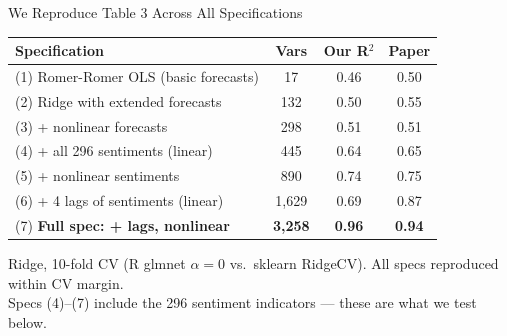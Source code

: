 \documentclass[10pt,aspectratio=169]{beamer}
\begin{document}
\begin{frame}{We Reproduce Table 3 Across All Specifications}
  \vspace{-2pt}
  \begin{center}
    \footnotesize
    \begin{tabular}{lccc}
      \toprule
      \textbf{Specification} & \textbf{Vars} & \textbf{Our R$^2$} & \textbf{Paper} \\
      \midrule
      (1) Romer-Romer OLS (basic forecasts)          & 17    & 0.46 & 0.50 \\
      (2) Ridge with extended forecasts              & 132   & 0.50 & 0.55 \\
      (3) + nonlinear forecasts                      & 298   & 0.51 & 0.51 \\
      (4) + all 296 sentiments (linear)              & 445   & 0.64 & 0.65 \\
      (5) + nonlinear sentiments                     & 890   & 0.74 & 0.75 \\
      (6) + 4 lags of sentiments (linear)            & 1,629 & 0.69 & 0.87 \\
      (7) \textbf{Full spec: + lags, nonlinear}      & \textbf{3,258} & \textbf{0.96} & \textbf{0.94} \\
      \bottomrule
    \end{tabular}
  \end{center}
  \vspace{4pt}
  \begin{block}{}
    \centering\small
    Ridge, 10-fold CV (R glmnet $\alpha=0$ vs.\ sklearn RidgeCV). All specs reproduced within CV margin.\\[2pt]
    Specs (4)--(7) include the 296 sentiment indicators --- these are what we test below.
  \end{block}
\end{frame}

\end{document}
